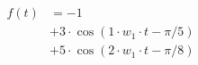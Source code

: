\begin{center}
\begin{align*}
f(t) &= -1 \\
&+ 3 \cdot \cos( 1 \cdot w_1 \cdot t - \pi/5) \\
&+ 5 \cdot \cos( 2 \cdot w_1 \cdot t - \pi/8)
\end{align*}
\end{center}
